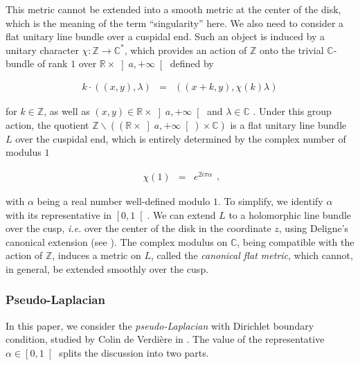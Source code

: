\documentclass{jams-l}
\theoremstyle{definition}
\theoremstyle{remark}
\numberwithin{equation}{section}
\begin{document}
            \noindent This metric cannot be extended into a smooth metric at the center of the disk, which is the meaning of the term ``singularity'' here. We also need to consider a flat unitary line bundle over a cuspidal end. Such an object is induced by a unitary character $\chi : \mathbb{Z} \longrightarrow \mathbb{C}^{\ast}$, which provides an action of $\mathbb{Z}$ onto the trivial $\mathbb{C}$-bundle of rank $1$ over $\mathbb{R} \times \left] a, + \infty \right[$ defined by
        
            \[ \begin{array}{lll}
                    k \cdot \left( \left( x,y \right), \lambda \right) & = & \left( \left( x+k, y \right), \chi \left( k \right)  \lambda \right) 
                \end{array} \]
        
            \noindent for $k \in \mathbb{Z}$, as well as $\left( x,y \right) \in \mathbb{R} \times \left] a, +\infty \right[$ and $\lambda \in \mathbb{C}$ . Under this group action, the quotient $\mathbb{Z} \backslash \left( \left( \mathbb{R} \times \left] a, + \infty \right[ \right) \times \mathbb{C} \right)$ is a flat unitary line bundle $L$ over the cuspidal end, which is entirely determined by the complex number of modulus $1$
        
            \[ \begin{array}{lll}
                \chi \left( 1 \right) & = & e^{2 i \pi \alpha}
            \end{array} , \]
        
            \noindent with $\alpha$ being a real number well-defined modulo $1$. To simplify, we identify $\alpha$ with its representative in $\left[ 0, 1 \right[$. We can extend $L$ to a holomorphic line bundle over the cusp, \textit{i.e.} over the center of the disk in the coordinate $z$, using Deligne's canonical extension (see \cite{MR0417174, MR2393625}). The complex modulus on $\mathbb{C}$, being compatible with the action of $\mathbb{Z}$, induces a metric on $L$, called the \textit{canonical flat metric}, which cannot, in general, be extended smoothly over the cusp.
            
            
        \subsubsection{Pseudo-Laplacian}
        
            In this paper, we consider the \textit{pseudo-Laplacian} with Dirichlet boundary condition, studied by Colin de Verdière in \cite{MR688031, MR699488}. The value of the representative $\alpha \in \left[ 0,1 \right[$ splits the discussion into two parts.
            
\end{document}
